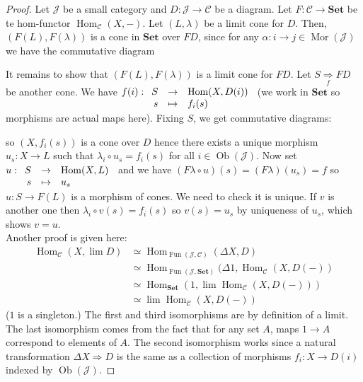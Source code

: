 \documentclass{article}
\newcommand{\cat}{\mathcal{C}}
\newcommand{\Jcat}{\mathcal{J}}
\newcommand{\Set}{\mathbf{Set}}
\DeclareMathOperator{\Ob}{Ob}
\DeclareMathOperator{\Mor}{Mor}
\DeclareMathOperator{\Hom}{Hom}
\DeclareMathOperator{\Fun}{Fun}
\newcommand{\applic}[4]{\begin{array}[t]{rcl}
#1 & \to & #2 \\
#3 & \mapsto & #4
\end{array}}
\theoremstyle{plain}
\theoremstyle{definition}
\theoremstyle{remark}
\begin{document}
\begin{proof}
    Let $\Jcat$ be a small category and $D : \Jcat \to \cat$ be a diagram. Let $F : \cat \to \Set$ be te hom-functor $\Hom_\cat (X,-)$. Let $(L,\lambda)$ be a limit cone for $D$. Then, $(F(L),F(\lambda))$ is a cone in $\Set$ over $FD$, since for any $\alpha : i\to j \in \Mor(\Jcat)$ we have the commutative diagram
    \begin{center}
    \end{center}
    It remains to show that $(F(L),F(\lambda))$ is a limit cone for $FD$. Let $S \underset{f}{\Rightarrow} FD$ be another cone. We have $f(i) : \applic{S}{\Hom(X,D(i))}{s}{f_i(s)}$ (we work in $\Set$ so morphisms are actual maps here). Fixing $S$, we get commutative diagrams:
    \begin{center}
    \end{center}
    so $(X,f_i(s))$ is a cone over $D$ hence there exists a unique morphism $u_s : X \to L$ such that $\lambda_i \circ u_s = f_i(s)$ for all $i \in \Ob(\Jcat)$. Now set $u : \applic{S}{\Hom(X,L)}{s}{u_s}$ and we have $(F\lambda \circ u)(s) = (F\lambda)(u_s) = f$ so $u : S \to F(L)$ is a morphism of cones. We need to check it is unique. If $v$ is another one then $\lambda_i \circ v(s) = f_i(s)$ so $v(s)=u_s$ by uniqueness of $u_s$, which shows $v=u$. \\
    Another proof is given here:
    \begin{align*}
        \Hom_\cat (X,\lim D) & \simeq \Hom_{\Fun(\Jcat,\cat)} (\Delta X,D) \\
        & \simeq \Hom_{\Fun(\Jcat,\Set)} (\Delta 1,\Hom_\cat (X,D(-))
        \\
        & \simeq \Hom_\Set(1,\lim \Hom_\cat(X,D(-)))
        \\
        & \simeq \lim \Hom_\cat (X,D(-))
    \end{align*}
    ($1$ is a singleton.) The first and third isomorphisms are by definition of a limit. The last isomorphism comes from the fact that for any set $A$, maps $1 \to A$ correspond to elements of $A$. The second isomorphism works since a natural transformation $\Delta X \Rightarrow D$ is the same as a collection of morphisms $f_i : X \to D(i)$ indexed by $\Ob(\Jcat)$.
\end{proof}
\end{document}
